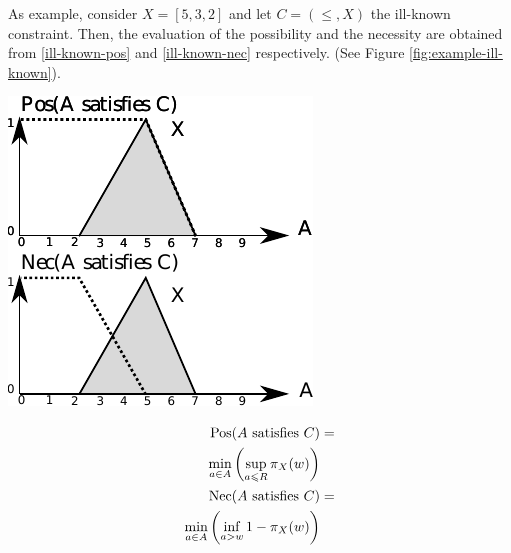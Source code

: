\begin{example}
As example, consider  $X = \left[5, 3, 2 \right]$ and let $C =(\leq, X)$ the ill-known constraint. Then, the evaluation of the possibility and the necessity are obtained from \eqref{ill-known-pos} and \eqref{ill-known-nec} respectively. (See Figure \ref{fig:example-ill-known}).


\vspace*{13pt}
\begin{center}
{
\includegraphics[scale=1]{./graphs/example-ill-known.pdf}
}
\end{center}
\vspace*{10pt}
\vspace*{13pt}



 
\begin{align}
\operatorname{Pos}(A\text{ satisfies }C) & =\\
\nonumber
\min_{a \in A}\left(\sup_{a \leqslant R}\pi_{X}(w)\right)\\
\operatorname{Nec}(A\text{ satisfies }C) & =\\
\nonumber
\min_{a \in A}\left(\inf_{a > w} 1-\pi_{X}(w)\right) 
\end{align}




\end{example}





